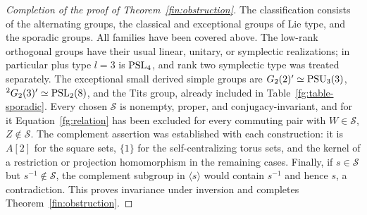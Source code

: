 \begin{proof}[Completion of the proof of Theorem~\ref{fin:obstruction}]
The classification consists of the alternating groups, the classical
and exceptional groups of Lie type, and the sporadic groups. All
families have been covered above. The low-rank orthogonal groups
have their usual linear, unitary, or symplectic realizations;
in particular plus type $l=3$ is $\operatorname{PSL}_4$, and rank two symplectic
type was treated separately. The exceptional small derived simple
groups are $G_2(2)'\simeq\operatorname{PSU}_3(3)$,
${}^2G_2(3)'\simeq\operatorname{PSL}_2(8)$, and the Tits group, already included
in Table~\ref{fg:table-sporadic}. Every chosen $\mathcal S$ is
nonempty, proper, and conjugacy-invariant, and for it
Equation~\eqref{fg:relation} has been excluded for every
commuting pair with $W\in\mathcal S$, $Z\notin\mathcal S$. The
complement assertion was established with each construction: it is
$A[2]$ for the square sets, $\{1\}$ for the self-centralizing torus
sets, and the kernel of a restriction or projection homomorphism in the
remaining cases. Finally, if $s\in\mathcal S$ but
$s^{-1}\notin\mathcal S$, the complement subgroup in $\langle s\rangle$
would contain $s^{-1}$ and hence $s$, a contradiction. This proves
invariance under inversion and completes Theorem~\ref{fin:obstruction}.
\end{proof}
